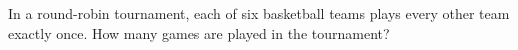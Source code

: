 In a round-robin tournament, each of six basketball teams plays every other team exactly once. How many games are played in the tournament?
